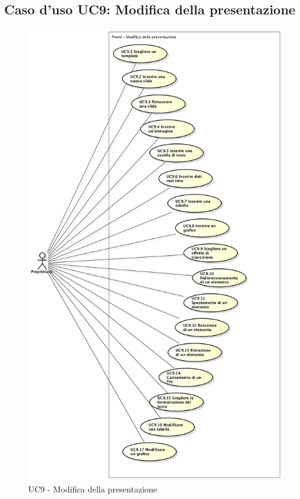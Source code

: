 \subsection{Caso d'uso UC9: Modifica della presentazione}
\begin{figure}[h] 
	\centering 
	\includegraphics[scale=0.3] {img/UC9.png} 
	\caption{UC9 - Modifica della presentazione} 
\end{figure}

